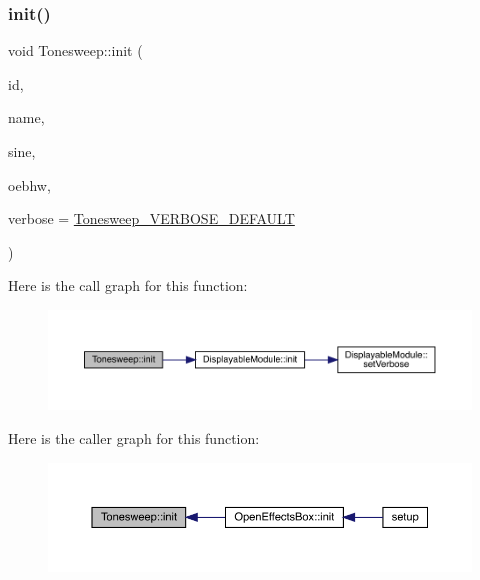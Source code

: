 \subsubsection{\texorpdfstring{init()}{init()}}
{\footnotesize\ttfamily void Tonesweep\+::init (\begin{DoxyParamCaption}\item[{int}]{id,  }\item[{char $\ast$}]{name,  }\item[{Audio\+Synth\+Tone\+Sweep $\ast$}]{sine,  }\item[{\mbox{\hyperlink{class_open_effects_box_h_w}{Open\+Effects\+Box\+HW}} $\ast$}]{oebhw,  }\item[{int}]{verbose = {\ttfamily \mbox{\hyperlink{_tonesweep_8h_aea3aceb167682523467a7c0df63856ae}{Tonesweep\+\_\+\+V\+E\+R\+B\+O\+S\+E\+\_\+\+D\+E\+F\+A\+U\+LT}}} }\end{DoxyParamCaption})}

Here is the call graph for this function\+:\nopagebreak
\begin{figure}[H]
\begin{center}
\leavevmode
\includegraphics[width=350pt]{class_tonesweep_ae427b7379a9f769aa05aeca6ad77bdd5_cgraph}
\end{center}
\end{figure}
Here is the caller graph for this function\+:\nopagebreak
\begin{figure}[H]
\begin{center}
\leavevmode
\includegraphics[width=350pt]{class_tonesweep_ae427b7379a9f769aa05aeca6ad77bdd5_icgraph}
\end{center}
\end{figure}
\mbox{\label{class_tonesweep_a26d324fb0de4aac00a04e7e7e9e812c0}} 
